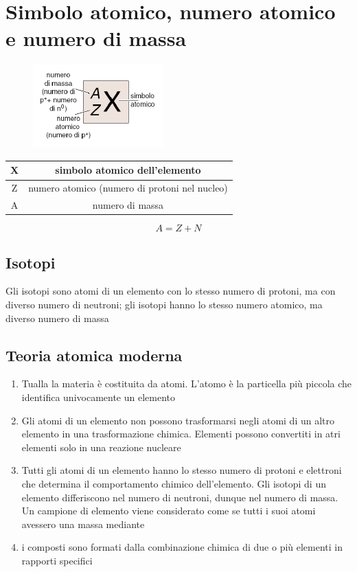 \documentclass[a4paper,11pt]{report}
\begin{document}
\section{Simbolo atomico, numero atomico e numero di massa}

\begin{figure}[H]
	\centering
	\includegraphics[width=0.2\linewidth, height=\textheight,keepaspectratio]{immagini/numero.png}
	\label{fig:numero}
\end{figure}

\begin{center}
\begin{tabular}{|c|c|}
	\hline
	X & simbolo atomico dell'elemento \\
	\hline
	Z & numero atomico (numero di protoni nel nucleo) \\
	\hline
	A & numero di massa	\\
	\hline
\end{tabular}
\end{center}

\[A = Z+N\]

\subsection*{Isotopi}

Gli isotopi sono atomi di un elemento con lo stesso numero di protoni, ma con diverso numero di neutroni; gli isotopi hanno lo stesso numero atomico, ma diverso numero di massa

\subsection*{Teoria atomica moderna}

\begin{enumerate}
	\item Tualla la materia è costituita da atomi. L'atomo è la particella più piccola che identifica univocamente un elemento 
 \item Gli atomi di un elemento non possono trasformarsi negli atomi di un altro elemento in una trasformazione chimica. Elementi possono convertiti in atri elementi solo in una reazione nucleare 
 \item Tutti gli atomi di un elemento hanno lo stesso numero di protoni e elettroni che determina il comportamento chimico dell'elemento. Gli isotopi di un elemento differiscono nel numero di neutroni, dunque nel numero di massa. Un campione di elemento viene considerato come se tutti i suoi atomi avessero una massa mediante
 \item i composti sono formati dalla combinazione chimica di due o più elementi in rapporti specifici
\end{enumerate}
\end{document}
